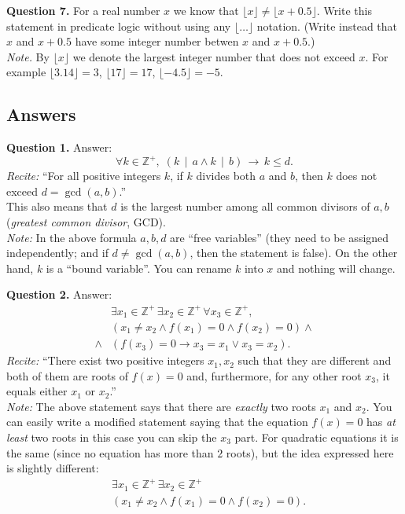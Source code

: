 \documentclass[jou]{apa6}
\begin{document}
\vspace{10pt}
{\bf Question 7.} 
For a real number $x$ we know that $\lfloor x \rfloor \neq 
\lfloor x + 0.5 \rfloor$. Write this statement in 
predicate logic without using any $\lfloor \ldots \rfloor$ 
notation. (Write instead that $x$ and $x+0.5$ have some integer number 
betwen $x$  and $x+0.5$.)\\
{\em Note.} By $\lfloor x \rfloor$ we denote the 
largest integer number that does not exceed $x$. 
For example $\lfloor 3.14 \rfloor = 3$, $\lfloor 17 \rfloor = 17$, 
$\lfloor -4.5 \rfloor = -5$. 


\newpage 

\subsection{Answers}


{\bf Question 1.} Answer:
$$\boxed{\forall k \in \mathbb{Z}^{+},\;\left(k\,\mid\,a \wedge 
k\,\mid\,b\right)\,\rightarrow\,k \leq d.}$$
{\em Recite:} ``For all positive integers $k$, if $k$ divides 
both $a$ and $b$, then $k$ does not exceed 
$d = \operatorname{gcd}(a,b)$.''\\
This also means that $d$ is the largest number among all
common divisors of $a,b$ ({\em greatest common divisor}, GCD).\\
{\em Note:} In the above formula $a,b,d$ are ``free variables''
(they need to be assigned independently; and if 
$d \neq \operatorname{gcd}(a,b)$, then the statement is false). 
On the other hand, $k$ is a ``bound variable''. You can rename
$k$ into $x$ \textendash{} and nothing will change.

\vspace{10pt}
{\bf Question 2.} Answer:
\begin{align}
 & \exists x_1 \in \mathbb{Z}^{+}\,\exists x_2 \in \mathbb{Z}^{+}\,
\forall x_3 \in \mathbb{Z}^{+}, \nonumber \\
 & \left( x_1 \neq x_2 \wedge f(x_1)=0 \wedge f(x_2) = 0 \right) \wedge \nonumber \\
\wedge & \left( f(x_3) = 0 \rightarrow x_3 = x_1 \vee x_3 = x_2 \right). 
\nonumber
\end{align}
{\em Recite:} ``There exist two positive integers $x_1,x_2$ 
such that they are different and 
both of them are roots of $f(x)=0$ and, 
furthermore, for any other root $x_3$, it 
equals either $x_1$ or $x_2$.''\\
{\em Note:} The above statement says that there are {\em exactly}
two roots $x_1$ and $x_2$. You can easily write a modified statement 
saying that the equation $f(x)=0$ has {\em at least} two roots \textendash{}
in this case you can skip the $x_3$ part. For quadratic equations it
is the same (since no equation has more than $2$ roots), but 
the idea expressed here is slightly different:
\begin{align}
 & \exists x_1 \in \mathbb{Z}^{+}\,\exists x_2 \in \mathbb{Z}^{+} \nonumber \\
 & \left( x_1 \neq x_2 \wedge f(x_1)=0 \wedge f(x_2) = 0 \right). \nonumber 
\end{align}
\end{document}
